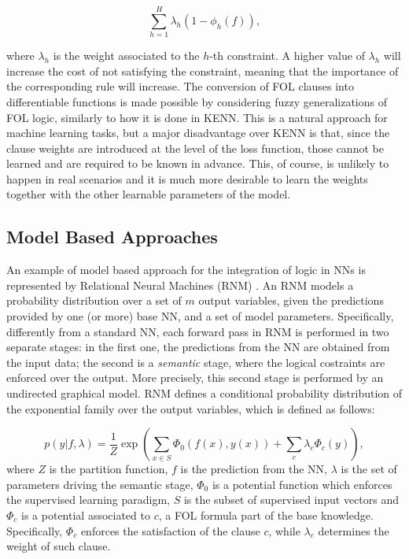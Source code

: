  $$ \sum_{h=1}^H \lambda_h(1 - \phi_h(f)), $$
 
 where $\lambda_h$ is the weight associated to the $h$-th constraint. A higher value of $\lambda_h$ will increase the cost of not satisfying the constraint, meaning that the importance of the corresponding rule will increase. The conversion of FOL clauses into differentiable functions is made possible by considering fuzzy generalizations of FOL logic, similarly to how it is done in KENN. This is a natural approach for machine learning tasks, but a major disadvantage over KENN is that, since the clause weights are introduced at the level of the loss function, those cannot be learned and are required to be known in advance. This, of course, is unlikely to happen in real scenarios and it is much more desirable to learn the weights together with the other learnable parameters of the model.
 
 \subsection{Model Based Approaches}
 An example of model based approach for the integration of logic in NNs is represented by Relational Neural Machines (RNM) \cite{marra2020relational}. An RNM models a probability distribution over a set of $m$ output variables, given the predictions provided by one (or more) base NN, and a set of model parameters. Specifically, differently from a standard NN, each forward pass in RNM is performed in two separate stages: in the first one, the predictions from the NN are obtained from the input data; the second is a \textit{semantic} stage, where the logical costraints are enforced over the output. More precisely, this second stage is performed by an undirected graphical model.
 RNM defines a conditional probability distribution of the exponential family over the output variables, which is defined as follows:
 
 \begin{equation*}
 p(y|f,\lambda) = \frac{1}{Z} \exp \left( \sum_{x \in S}\Phi_0(f(x),y(x))+\sum_c \lambda_c \Phi_c(y) \right), 
 \end{equation*}
 where $Z$ is the partition function, $f$ is the prediction from the NN, $\lambda$ is the set of parameters driving the semantic stage, $\Phi_0$ is a potential function which enforces the supervised learning paradigm, $S$ is the subset of supervised input vectors and $\Phi_c$ is a potential associated to $c$, a FOL formula part of the base knowledge. Specifically, $\Phi_c$ enforces the satisfaction of the clause $c$, while $\lambda_c$ determines the weight of such clause. 
 
